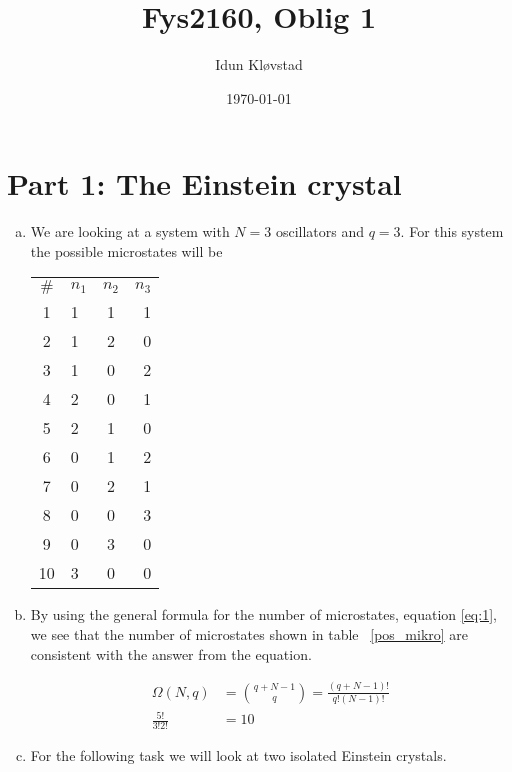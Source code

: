 \documentclass[a4paper,norsk,12pt,oneside]{article}
\title{Fys2160, Oblig 1}
\author{Idun Kløvstad}
\date{\today}
\begin{document}
\maketitle
\newpage 

\section{Part 1: The Einstein crystal}
\begin{enumerate}[a)]
    \item 

        We are looking at a system with \(N = 3\) oscillators and \(q = 3\). 
        For this system the possible microstates will be 

        \begin{tabular}{c | l | c | r }
            \label{pos_mikro}
            \(\#\) & \(n_1\) & \(n_2\) &\(n_3\) \\
            1 &1 & 1 & 1 \\
            2 & 1 & 2 & 0 \\
            3 & 1 & 0 & 2 \\
            4 & 2 & 0 & 1 \\
            5 & 2 & 1 & 0 \\
            6 & 0 & 1 & 2 \\
            7 & 0 & 2 & 1 \\
            8 & 0 & 0 & 3 \\
            9 & 0 & 3 & 0 \\
            10 & 3 & 0 & 0 \\
            \end{tabular}

    \item

        By using the general formula for the number of microstates, equation \ref{eq:1}, we 
        see that the number of microstates shown in table ~\ref{pos_mikro} are consistent 
        with the  answer from the equation. 

        \begin{align}
            \label{eq:1}
            \Omega(N,q) &= \binom{q + N -1}{q} = \frac{(q + N - 1)!}{q!(N - 1)!}\\
            \frac{5!}{3!2!} &= 10
        \end{align}

    \item

        For the following task we will look at two isolated Einstein crystals. 


\end{enumerate}
\end{document}
